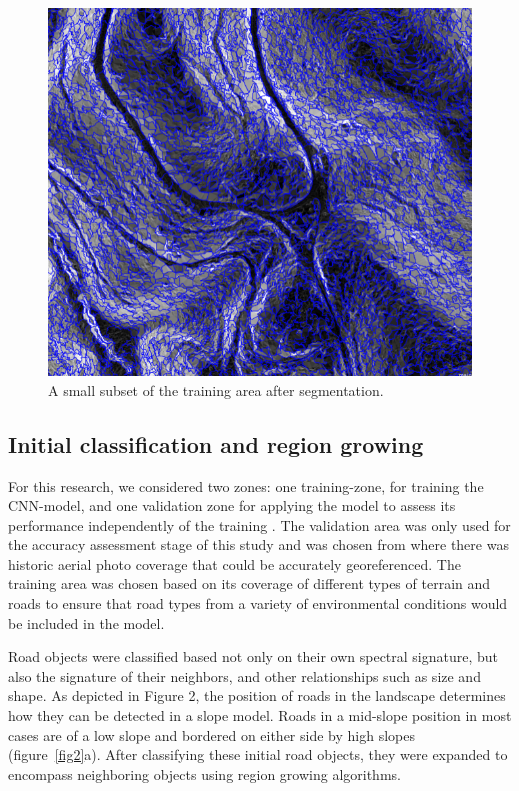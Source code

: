 \documentclass[remotesensing,article,submit,pdftex,moreauthors]{Definitions/mdpi}
\begin{document}
\begin{figure}[H]
\includegraphics[width=10.5 cm]{segment.png}
\caption{A small subset of the training area after segmentation.  \label{fig4}}
\end{figure}   


\subsection{Initial classification and region growing}


For this research, we considered two zones: one training-zone, for training the CNN-model, and one validation zone for applying the model to assess its performance independently of the training \cite{navulur, prakash}. The validation area was only used for the accuracy assessment stage of this study and was chosen from where there was historic aerial photo coverage that could be accurately georeferenced. The training area was chosen based on its coverage of different types of terrain and roads to ensure that road types from a variety of environmental conditions would be included in the model.

Road objects were classified based not only on their own spectral signature, but also the signature of their neighbors, and other relationships such as size and shape. As depicted in Figure 2, the position of roads in the landscape determines how they can be detected in a slope model. Roads in a mid-slope position in most cases are of a low slope and bordered on either side by high slopes (figure~\ref{fig2}a). After classifying these initial road objects, they were expanded to encompass neighboring objects using region growing algorithms.
\end{document}
